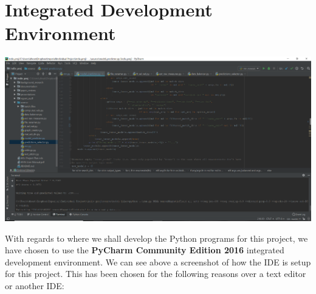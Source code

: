 \documentclass[12pt,twoside]{report}
\begin{document}
\section{Integrated Development Environment}

\begin{center}
\includegraphics[scale=1]{project_figures/fig4_2}
\end{center}
\quad With regards to where we shall develop the Python programs for this project, we have chosen to use the \textbf{PyCharm Community Edition 2016} integrated development environment. We can see above a screenshot of how the IDE is setup for this project. This has been chosen for the following reasons over a text editor or another IDE:
\end{document}
